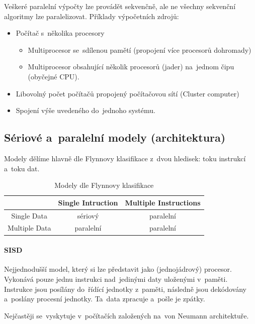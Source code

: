 Veškeré paralelní výpočty lze provádět sekvenčně, ale ne všechny sekvenční algoritmy lze paralelizovat. Příklady výpočetních zdrojů:
\begin{itemize}
	\item Počítač s~několika procesory
	      \begin{itemize}
		      \item Multiprocesor se~sdílenou pamětí (propojení více procesorů dohromady)
		      \item Multiprocesor obsahující několik procesorů (jader) na~jednom čipu (obyčejné CPU).
	      \end{itemize}
	\item Libovolný počet počítačů propojený počítačovou sítí (Cluster computer)
	\item Spojení výše uvedeného do~jednoho systému.
\end{itemize}

\subsection{Sériové a~paralelní modely (architektura)}

Modely dělíme hlavně dle Flynnovy klasifikace z~dvou hledisek: toku instrukcí a~toku dat.

\begin{table}[ht]
	\centering
	\caption{Modely dle Flynnovy klasifikace}

	\begin{tabular}{c|cc}
		{}            & Single Intruction & Multiple Instructions \\
		\hline
		Single Data   & sériový           & paralelní             \\
		Multiple Data & paralelní         & paralelní             \\
	\end{tabular}
\end{table}

\paragraph{SISD}

Nejjednodušší model, který si lze představit jako (jednojádrový) procesor. Vykonává pouze jednu instrukci nad~jedinými daty uloženými v~paměti. Instrukce jsou posílány do~řídící jednotky z~paměti, následně jsou dekódovány a~poslány procesní jednotky. Ta~data zpracuje a~pošle je zpátky.

Nejčastěji se~vyskytuje v~počítačích založených na~von Neumann architektuře.

